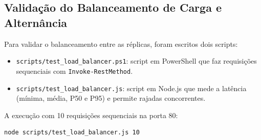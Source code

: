 \documentclass[12pt,a4paper]{article}
\begin{document}
\subsection{Validação do Balanceamento de Carga e Alternância}
Para validar o balanceamento entre as réplicas, foram escritos dois scripts:
\begin{itemize}
    \item \texttt{scripts/test\_load\_balancer.ps1}: script em PowerShell que faz requisições sequenciais com \texttt{Invoke-RestMethod}.
    \item \texttt{scripts/test\_load\_balancer.js}: script em Node.js que mede a latência (mínima, média, P50 e P95) e permite rajadas concorrentes.
\end{itemize}

A execução com 10 requisições sequenciais na porta 80:
\begin{lstlisting}[language=bash]
node scripts/test_load_balancer.js 10
\end{lstlisting}
\end{document}
